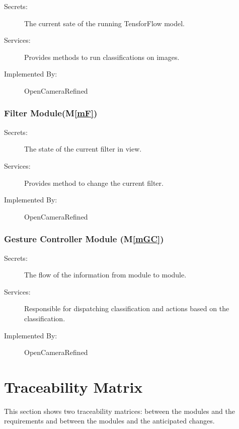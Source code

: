 \documentclass[12pt, titlepage]{article}
\newcommand{\mref}[1]{M\ref{#1}}
\begin{document}
\begin{description}
\item[Secrets:]The current sate of the running TensforFlow model.
\item[Services:]Provides methods to run classifications on images.
\item[Implemented By:] OpenCameraRefined
\end{description}

\subsubsection{Filter Module(\mref{mF})}

\begin{description}
\item[Secrets:]The state of the current filter in view.
\item[Services:]Provides method to change the current filter.
\item[Implemented By:] OpenCameraRefined
\end{description}

\subsubsection{Gesture Controller Module (\mref{mGC})}

\begin{description}
\item[Secrets:]The flow of the information from module to module.
\item[Services:]Responsible for dispatching classification and actions based on the classification.
\item[Implemented By:] OpenCameraRefined
\end{description}


\section{Traceability Matrix} \label{SecTM}

This section shows two traceability matrices: between the modules and the
requirements and between the modules and the anticipated changes.
\end{document}
